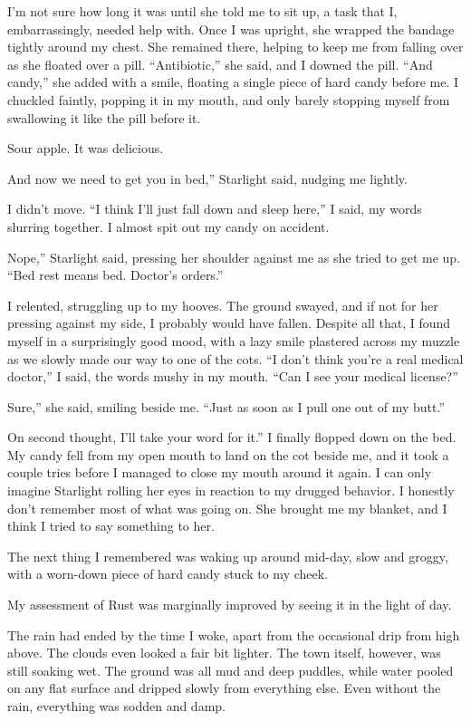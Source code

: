 I’m not sure how long it was until she told me to sit up, a task that I, embarrassingly, needed help with. Once I was upright, she wrapped the bandage tightly around my chest. She remained there, helping to keep me from falling over as she floated over a pill. “Antibiotic,” she said, and I downed the pill. “And candy,” she added with a smile, floating a single piece of hard candy before me. I chuckled faintly, popping it in my mouth, and only barely stopping myself from swallowing it like the pill before it.

Sour apple. It was delicious.

\leavevmode{}And now we need to get you in bed,” Starlight said, nudging me lightly.

I didn’t move. “I think I’ll just fall down and sleep here,” I said, my words slurring together. I almost spit out my candy on accident.

\leavevmode{}Nope,” Starlight said, pressing her shoulder against me as she tried to get me up. “Bed rest means bed. Doctor’s orders.”

I relented, struggling up to my hooves. The ground swayed, and if not for her pressing against my side, I probably would have fallen. Despite all that, I found myself in a surprisingly good mood, with a lazy smile plastered across my muzzle as we slowly made our way to one of the cots. “I don’t think you’re a real medical doctor,” I said, the words mushy in my mouth. “Can I see your medical license?”

\leavevmode{}Sure,” she said, smiling beside me. “Just as soon as I pull one out of my butt.”

\leavevmode{}On second thought, I’ll take your word for it.” I finally flopped down on the bed. My candy fell from my open mouth to land on the cot beside me, and it took a couple tries before I managed to close my mouth around it again. I can only imagine Starlight rolling her eyes in reaction to my drugged behavior. I honestly don’t remember most of what was going on. She brought me my blanket, and I think I tried to say something to her.

The next thing I remembered was waking up around mid-day, slow and groggy, with a worn-down piece of hard candy stuck to my cheek.

{\br}%
My assessment of Rust was marginally improved by seeing it in the light of day.

The rain had ended by the time I woke, apart from the occasional drip from high above. The clouds even looked a fair bit lighter. The town itself, however, was still soaking wet. The ground was all mud and deep puddles, while water pooled on any flat surface and dripped slowly from everything else. Even without the rain, everything was sodden and damp.

